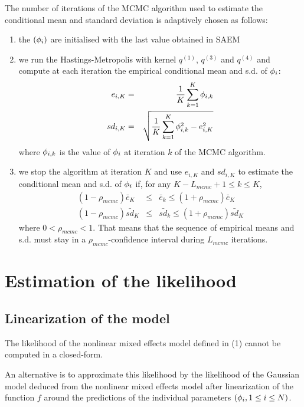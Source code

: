 The number of iterations of the MCMC algorithm used to estimate the conditional mean and standard deviation is adaptively chosen as follows:
\begin{enumerate}
  \item the $({\phi}_i)$ are initialised with the last value obtained in SAEM
  \item we run the Hastings-Metropolis with kernel $q^{(1)}$, $q^{(3)}$ and $q^{(4)}$ and compute at each iteration the empirical conditional mean and s.d. of ${\phi}_i$:
  \begin{eqnarray}
  e_{i,K} &= &\frac{1}{K}\sum_{k=1}^K {\phi}_{i,k} \\
  sd_{i,K} &= &\sqrt{\frac{1}{K}\sum_{k=1}^K {\phi}_{i,k}^2 - e_{i,K}^2 }
  \end{eqnarray}
  where ${\phi}_{i,k}$ is the value of ${\phi}_i$ at iteration $k$ of the MCMC algorithm.
  \item we stop the algorithm at iteration $K$ and use $e_{i,K}$ and $sd_{i,K}$ to estimate the conditional mean and s.d. of ${\phi}_i$ if, for any $ K-L_{mcmc}+1 \leq k \leq K$,
  \begin{eqnarray}
  \label{Lmcmc}  (1-\rho_{mcmc})\bar{e}_K & \leq & \bar{e}_k \leq  (1+\rho_{mcmc})\bar{e}_{K} \\
  \nonumber  (1-\rho_{mcmc})\bar{sd}_{K} & \leq & \bar{sd}_{k} \leq  (1+\rho_{mcmc})\bar{sd}_{K}
  \end{eqnarray}
where $0<\rho_{mcmc}<1$. That means that the sequence of empirical means and s.d. must stay in a $\rho_{mcmc}$-confidence interval during $L_{mcmc}$ iterations.
\end{enumerate}

\section{Estimation of the likelihood} \label{estilik}
\subsection{Linearization of the model}
The likelihood of the nonlinear mixed effects model defined in (1) cannot be computed in a closed-form.

An alternative is  to approximate this likelihood  by the likelihood of the Gaussian model deduced from the nonlinear mixed
effects model after linearization of the function $f$ around
the predictions of the individual parameters $({{\phi}_i}, 1\leq i \leq N) $.

